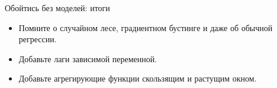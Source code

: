 \begin{frame}{Обойтись без моделей: итоги}

  \begin{itemize}[<+->]
    \item Помните о \alert{случайном лесе}, \alert{градиентном бустинге} и даже об \alert{обычной регрессии}.
    \item Добавьте \alert{лаги зависимой переменной}.
    \item Добавьте \alert{агрегирующие функции} скользящим и растущим окном. 
  \end{itemize}
\end{frame}

